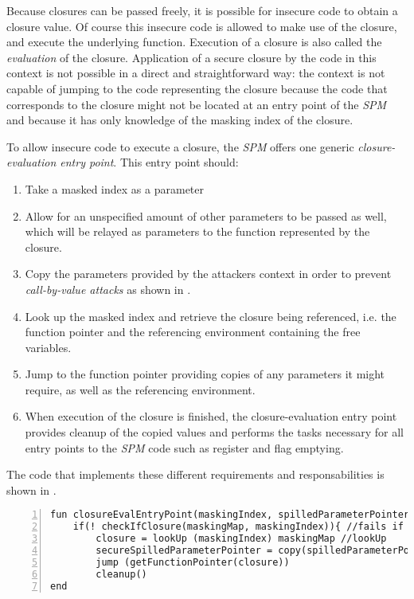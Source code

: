 Because closures can be passed freely, it is possible for insecure code to obtain a closure value.
Of course this insecure code is allowed to make use of the closure, and execute the underlying function.
Execution of a closure is also called the \emph{evaluation} of the closure.
Application of a secure closure by the code in this context is not possible in a direct and straightforward way: the context is not capable of jumping to the code representing the closure because the code that corresponds to the closure might not be located at an entry point of the \emph{SPM} and because it has only knowledge of the masking index of the closure.

To allow insecure code to execute a closure, the \emph{SPM} offers one generic \emph{closure-evaluation entry point}. This entry point should:

\begin{enumerate}
\item Take a masked index as a parameter
\item Allow for an unspecified amount of other parameters to be passed as well, which will be relayed as parameters to the function represented by the closure.
\item Copy the parameters provided by the attackers context in order to prevent \emph{call-by-value attacks} as shown in .
\item Look up the masked index and retrieve the closure being referenced, i.e. the function pointer and the referencing environment containing the free variables.
\item Jump to the function pointer providing copies of any parameters it might require, as well as the referencing environment.
\item When execution of the closure is finished, the closure-evaluation entry point provides cleanup of the copied values and performs the tasks necessary for all entry points to the \emph{SPM} code such as register and flag emptying.
\end{enumerate}

The code that implements these different requirements and responsabilities is shown in .

\begin{lstlisting}[frame=single,numbers=left, language={[x86masm]Assembler}, caption=The generic closure-evaluation entry point.,
label=llvm:EvalEntryPoint]
fun closureEvalEntryPoint(maskingIndex, spilledParameterPointer)
    if(! checkIfClosure(maskingMap, maskingIndex)){ //fails if the index does not exist or does not reference a closure.
        closure = lookUp (maskingIndex) maskingMap //lookUp
        secureSpilledParameterPointer = copy(spilledParameterPointer)
        jump (getFunctionPointer(closure))
        cleanup()
end 
\end{lstlisting}

